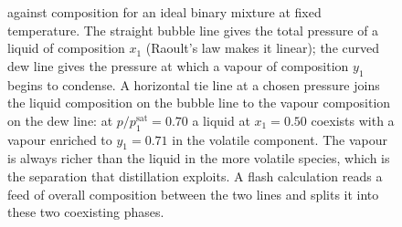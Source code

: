 \begin{figure}[htbp]
{against composition for an ideal binary mixture at fixed temperature. The
straight bubble line gives the total pressure of a liquid of composition
$x_1$ (Raoult's law makes it linear); the curved dew line gives the pressure
at which a vapour of composition $y_1$ begins to condense. A horizontal tie
line at a chosen pressure joins the liquid composition on the bubble line to
the vapour composition on the dew line: at $p/p_1^{\text{sat}} = 0.70$ a
liquid at $x_1 = 0.50$ coexists with a vapour enriched to $y_1 = 0.71$ in
the volatile component. The vapour is always richer than the liquid in the
more volatile species, which is the separation that distillation exploits.
A flash calculation reads a feed of overall composition between the two
lines and splits it into these two coexisting phases.}
\label{fig:vol04ch02:binary-pxy}
\end{figure}
